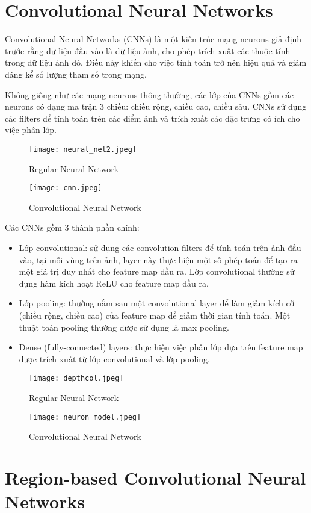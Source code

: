 \documentclass[../thesis.tex]{subfiles}
\begin{document}
\section{Convolutional Neural Networks}

Convolutional Neural Networks (CNNs) là một kiến trúc mạng neurons giả định trước rằng dữ liệu đầu vào là dữ liệu ảnh, cho phép trích xuất các thuộc tính trong dữ liệu ảnh đó. Điều này khiến cho việc tính toán trở nên hiệu quả và giảm đáng kể số lượng tham số trong mạng.

Không giống như các mạng neurons thông thường, các lớp của CNNs gồm các neurons có dạng ma trận 3 chiều: chiều rộng, chiều cao, chiều sâu. CNNs sử dụng các filters để tính toán trên các điểm ảnh và trích xuất các đặc trưng có ích cho việc phân lớp.
\begin{figure}[!htb]
	\begin{minipage}{0.48\textwidth}
		\centering
		\texttt{[image: neural\_net2.jpeg]}
		\caption{Regular Neural Network}\label{Fig:NN}
	\end{minipage}\hfill
	\begin {minipage}{0.48\textwidth}
		\centering
		\texttt{[image: cnn.jpeg]}
		\caption{Convolutional Neural Network}\label{Fig:CNN}
	\end{minipage}
\end{figure}

Các CNNs gồm 3 thành phần chính: 

\begin{itemize}
  \item Lớp convolutional: sử dụng các convolution filters để tính toán trên ảnh đầu vào, tại mỗi vùng trên ảnh, layer này thực hiện một số phép toán để tạo ra một giá trị duy nhất cho feature map đầu ra. Lớp convolutional thường sử dụng hàm kích hoạt ReLU cho feature map đầu ra.
  \item Lớp pooling: thường nằm sau một convolutional layer để làm giảm kích cỡ (chiều rộng, chiều cao) của feature map để giảm thời gian tính toán. Một thuật toán pooling thường được sử dụng là max pooling.
  \item Dense (fully-connected) layers: thực hiện việc phân lớp dựa trên feature map được trích xuất từ lớp convolutional và lớp pooling.
\end{itemize}

\begin{figure}[!htb]
	\begin{minipage}{0.48\textwidth}
		\centering
		\texttt{[image: depthcol.jpeg]}
		\caption{Regular Neural Network}\label{Fig:depthcol}
	\end{minipage}\hfill
	\begin {minipage}{0.48\textwidth}
		\centering
		\texttt{[image: neuron\_model.jpeg]}
		\caption{Convolutional Neural Network}\label{Fig:neural_model}
	\end{minipage}
\end{figure}

\section{Region-based Convolutional Neural Networks}
\end{document}
